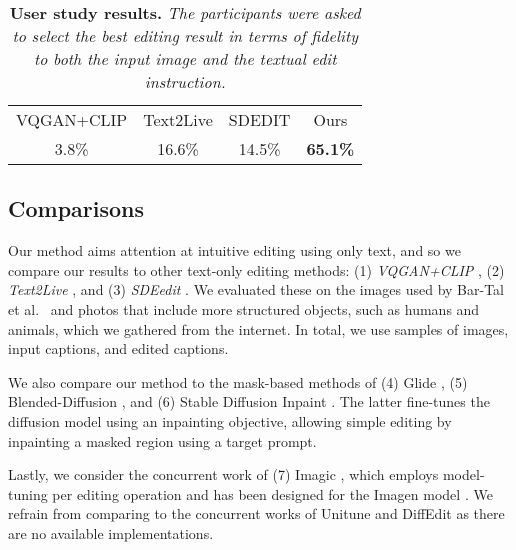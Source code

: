  \begin{table}
\caption{{\bf User study results.} {\it The participants were asked to select the best editing result in terms of fidelity to both the input image and the textual edit instruction.}}
 \footnotesize
 \centering
\vspace{-0.25cm}
\begin{tabular}{cccc}

\toprule

VQGAN+CLIP & Text2Live & SDEDIT & Ours \\
3.8\% & 16.6\% & 14.5\%  & {\bf 65.1\%} \\


\bottomrule
\end{tabular}
\vspace{-0.2cm}
\label{tab:user-study}
 \end{table}
 
  
\subsection{Comparisons}
\label{sec:comparisons}




Our method aims attention at intuitive editing using only text, and so we compare our results to other text-only editing methods: (1) \textit{VQGAN+CLIP} \cite{katherine2021vqganclip}, (2) \textit{Text2Live} \cite{bar2022text2live}, and (3) \textit{SDEedit} \cite{meng2021sdedit}. We evaluated these on the images used by Bar-Tal et al.~\cite{bar2022text2live} and photos that include more structured objects, such as humans and animals, which we gathered from the internet. In total, we use  samples of images, input captions, and edited captions. 


We also compare our method to the mask-based methods of (4) Glide \cite{nichol2021glide}, (5) Blended-Diffusion \cite{avrahami2022blended}, and (6) Stable Diffusion Inpaint \cite{rombach2021highresolution}. The latter fine-tunes the diffusion model using an inpainting objective, allowing simple editing by inpainting a masked region using a target prompt.



Lastly, we consider the concurrent work of (7) Imagic \cite{Kawar2022ImagicTR}, which employs model-tuning per editing operation and has been designed for the Imagen model \cite{saharia2022photorealistic}. 
We refrain from comparing to the concurrent works of Unitune \cite{valevski2022unitune} and DiffEdit \cite{couairon2022diffedit} as there are no available implementations.







